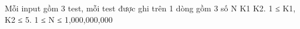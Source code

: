 Mỗi input gồm 3 test, mỗi test được ghi trên 1 dòng gồm 3 số N K1 K2. 1 ≤ K1, K2 ≤ 5. 1 ≤ N ≤ 1,000,000,000